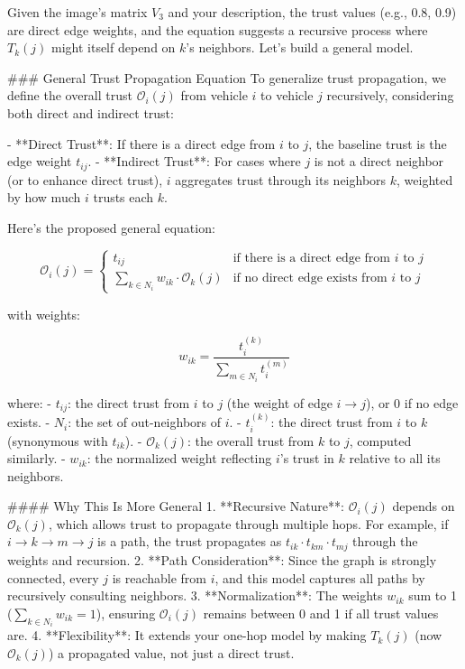 \documentclass{article}
\begin{document}
Given the image’s matrix \( V_3 \) and your description, the trust values (e.g., 0.8, 0.9) are direct edge weights, and the equation suggests a recursive process where \( T_k(j) \) might itself depend on \( k \)’s neighbors. Let’s build a general model.

### General Trust Propagation Equation
To generalize trust propagation, we define the overall trust \( \mathcal{O}_i(j) \) from vehicle \( i \) to vehicle \( j \) recursively, considering both direct and indirect trust:

- **Direct Trust**: If there is a direct edge from \( i \) to \( j \), the baseline trust is the edge weight \( t_{ij} \).
- **Indirect Trust**: For cases where \( j \) is not a direct neighbor (or to enhance direct trust), \( i \) aggregates trust through its neighbors \( k \), weighted by how much \( i \) trusts each \( k \).

Here’s the proposed general equation:

\[ \mathcal{O}_i(j) = \begin{cases} 
t_{ij} & \text{if there is a direct edge from } i \text{ to } j \\
\sum_{k \in N_i} w_{ik} \cdot \mathcal{O}_k(j) & \text{if no direct edge exists from } i \text{ to } j
\end{cases} \]

with weights:

\[ w_{ik} = \frac{t_i^{(k)}}{\sum_{m \in N_i} t_i^{(m)}} \]

where:
- \( t_{ij} \): the direct trust from \( i \) to \( j \) (the weight of edge \( i \to j \)), or 0 if no edge exists.
- \( N_i \): the set of out-neighbors of \( i \).
- \( t_i^{(k)} \): the direct trust from \( i \) to \( k \) (synonymous with \( t_{ik} \)).
- \( \mathcal{O}_k(j) \): the overall trust from \( k \) to \( j \), computed similarly.
- \( w_{ik} \): the normalized weight reflecting \( i \)’s trust in \( k \) relative to all its neighbors.

#### Why This Is More General
1. **Recursive Nature**: \( \mathcal{O}_i(j) \) depends on \( \mathcal{O}_k(j) \), which allows trust to propagate through multiple hops. For example, if \( i \to k \to m \to j \) is a path, the trust propagates as \( t_{ik} \cdot t_{km} \cdot t_{mj} \) through the weights and recursion.
2. **Path Consideration**: Since the graph is strongly connected, every \( j \) is reachable from \( i \), and this model captures all paths by recursively consulting neighbors.
3. **Normalization**: The weights \( w_{ik} \) sum to 1 (\( \sum_{k \in N_i} w_{ik} = 1 \)), ensuring \( \mathcal{O}_i(j) \) remains between 0 and 1 if all trust values are.
4. **Flexibility**: It extends your one-hop model by making \( T_k(j) \) (now \( \mathcal{O}_k(j) \)) a propagated value, not just a direct trust.
\end{document}
